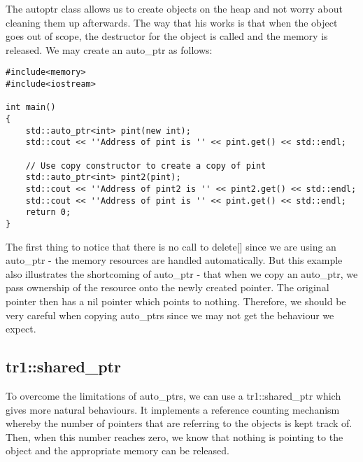 The autoptr class allows us to create objects on the heap and not
worry about cleaning them up afterwards. The way that his works is
that when the object goes out of scope, the destructor for the object
is called and the memory is released. We may create an auto\_ptr as
follows:
\begin{lstlisting}
#include<memory>
#include<iostream>

int main()
{
	std::auto_ptr<int> pint(new int);
	std::cout << ''Address of pint is '' << pint.get() << std::endl;
	
	// Use copy constructor to create a copy of pint
	std::auto_ptr<int> pint2(pint);
	std::cout << ''Address of pint2 is '' << pint2.get() << std::endl;
	std::cout << ''Address of pint is '' << pint.get() << std::endl;
	return 0;
} 
\end{lstlisting}
The first thing to notice that there is no call to delete[] since we
are using an auto\_ptr - the memory resources are handled
automatically. But this example also illustrates the shortcoming of
auto\_ptr - that when we copy an auto\_ptr, we pass ownership of the
resource onto the newly created pointer. The original pointer then has
a nil pointer which points to nothing. Therefore, we should be very
careful when copying auto\_ptrs since we may not get the behaviour we
expect.

\subsection{tr1::shared\_ptr}
\label{sec:tr1::shared_ptr}

To overcome the limitations of auto\_ptrs, we can use a
tr1::shared\_ptr which gives more natural behaviours. It implements a
reference counting mechanism whereby the number of pointers that are
referring to the objects is kept track of. Then, when this number
reaches zero, we know that nothing is pointing to the object and the
appropriate memory can be released. 

